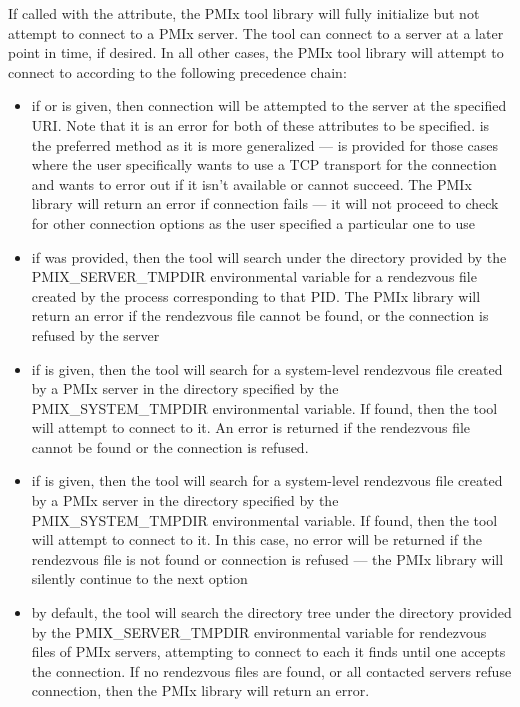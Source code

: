 If called with the  attribute, the \ac{PMIx} tool library will fully initialize but not attempt to connect to a \ac{PMIx} server. The tool can connect to a server at a later point in time, if desired. In all other cases, the \ac{PMIx} tool library will attempt to connect to according to the following precedence chain:

\begin{itemize}
    \item if  or  is given, then connection will be attempted to the server at the specified \ac{URI}. Note that it is an error for both of these attributes to be specified.  is the preferred method as it is more generalized ---  is provided for those cases where the user specifically wants to use a TCP transport for the connection and wants to error out if it isn't available or cannot succeed. The \ac{PMIx} library will return an error if connection fails --- it will not proceed to check for other connection options as the user specified a particular one to use
    \item if  was provided, then the tool will search under the directory provided by the PMIX\_SERVER\_TMPDIR environmental variable for a rendezvous file created by the process corresponding to that \ac{PID}. The \ac{PMIx} library will return an error if the rendezvous file cannot be found, or the connection is refused by the server
    \item if  is given, then the tool will search for a system-level rendezvous file created by a \ac{PMIx} server in the directory specified by the PMIX\_SYSTEM\_TMPDIR environmental variable. If found, then the tool will attempt to connect to it. An error is returned if the rendezvous file cannot be found or the connection is refused.
    \item if  is given, then the tool will search for a system-level rendezvous file created by a \ac{PMIx} server in the directory specified by the PMIX\_SYSTEM\_TMPDIR environmental variable. If found, then the tool will attempt to connect to it. In this case, no error will be returned if the rendezvous file is not found or connection is refused --- the \ac{PMIx} library will silently continue to the next option
    \item by default, the tool will search the directory tree under the directory provided by the PMIX\_SERVER\_TMPDIR environmental variable for rendezvous files of \ac{PMIx} servers, attempting to connect to each it finds until one accepts the connection. If no rendezvous files are found, or all contacted servers refuse connection, then the \ac{PMIx} library will return an error.
\end{itemize}

